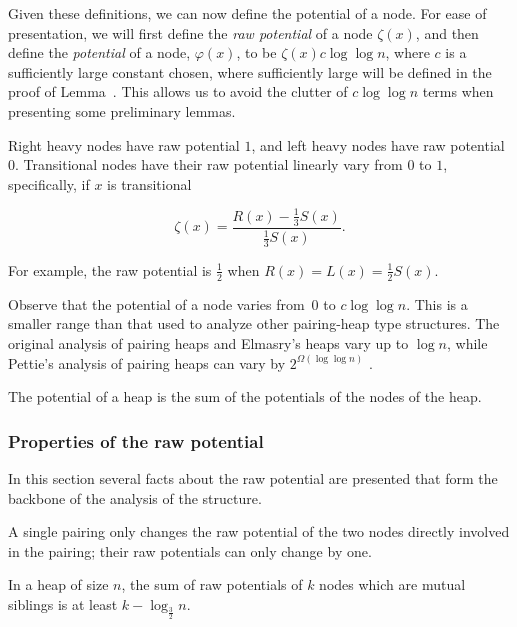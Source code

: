 \begin{fullonly}
Given these definitions, we can now define the potential of a node. For ease of presentation, we will first define the \emph{raw potential} of a node $\zeta(x)$, and then define the \emph{potential} of a node, $\varphi(x)$, to be $\zeta(x) c \log \log n$, where $c$ is a sufficiently large constant chosen, where sufficiently large will be defined in the proof of Lemma~. This allows us to avoid the clutter of $c \log \log n$ terms when presenting some preliminary lemmas.

 Right heavy nodes have raw potential $1$, and left heavy nodes have raw potential $0$. Transitional nodes have their raw potential linearly vary from $0$ to $1$, specifically, if $x$ is transitional 

$$\zeta(x)=\frac{R(x)-\frac{1}{3}S(x)}{\frac{1}{3}S(x)}.$$

For example, the raw potential is $\frac{1}{2}$ when $R(x)=L(x)=\frac{1}{2}S(x)$.


Observe that the potential of a node varies from~0 to $c\log \log n$. This is a smaller range than that used to analyze other pairing-heap type structures. The original analysis of pairing heaps \cite{DBLP:journals/algorithmica/FredmanSST86} and Elmasry's heaps \cite{DBLP:conf/soda/Elmasry09} vary up to $\log n$, while Pettie's analysis of pairing heaps can vary by $2^{\Omega(\log \log n)}$ \cite{DBLP:conf/focs/Pettie05}.

The potential of a heap is the sum of the potentials of the nodes of the heap. 

\subsubsection{Properties of the raw potential}

In this section several facts about the raw potential are presented that form the backbone of the analysis of the structure.

\begin{obs} \checked {}
A single pairing only changes the raw potential of the two nodes directly involved in the pairing; their raw potentials can only change by one.
\end{obs}

\begin{lemma}  \checked
In a heap of size $n$, the sum of raw potentials of $k$ nodes which are mutual siblings is at least $k-\log_\frac{3}{2} n$.
\end{lemma}


\end{fullonly}
